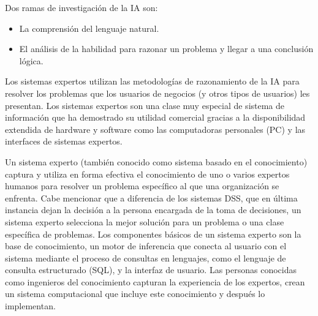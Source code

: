 Dos ramas de investigación de la IA son: 

\begin{itemize}

\item La comprensión del lenguaje natural. 
\item El análisis de la habilidad para razonar un problema y llegar a una conclusión lógica. 

\end{itemize}

Los sistemas expertos utilizan las metodologías de razonamiento de la IA para resolver los problemas que los usuarios de negocios (y otros tipos de usuarios) les presentan. Los sistemas expertos son una clase muy especial de sistema de información que ha demostrado su utilidad comercial gracias a la disponibilidad extendida de hardware y software como las computadoras personales (PC) y las interfaces de sistemas expertos.


Un sistema experto (también conocido como sistema basado en el conocimiento) captura y utiliza en forma efectiva el conocimiento de uno o varios expertos humanos para resolver un problema específico al que una organización se enfrenta. Cabe mencionar que a diferencia de los sistemas DSS, que en última instancia dejan la decisión a la persona encargada de la toma de decisiones, un sistema experto selecciona la mejor solución para un problema o una clase específica de problemas. Los componentes básicos de un sistema experto son la base de conocimiento, un motor de inferencia que conecta al usuario con el sistema mediante el proceso de consultas en lenguajes, como el lenguaje de consulta estructurado (SQL), y la interfaz de usuario. Las personas conocidas como ingenieros del conocimiento capturan la experiencia de los expertos, crean un sistema computacional que incluye este conocimiento y después lo implementan\cite{kendall2005analisis}.



